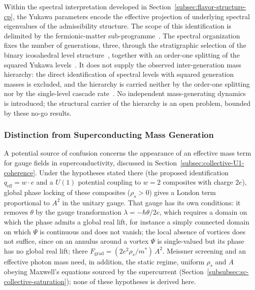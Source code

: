     Within the spectral interpretation developed in
    Section~\ref{subsec:flavor-structure-cp},
    the Yukawa parameters encode the effective projection of underlying
    spectral eigenvalues of the admissibility structure.
    The scope of this identification is delimited by the fermionic-matter
    sub-programme~\cite{Beau2026fmnote}.
    The spectral organization fixes the number of generations, three, through the
    stratigraphic selection of the binary icosahedral level structure~\cite{Beau2026a4},
    together with an order-one splitting of the squared Yukawa levels~\cite{Beau2026pyo}.
    It does not supply the observed inter-generation mass hierarchy:
    the direct identification of spectral levels with squared generation masses is
    excluded, and the hierarchy is carried neither by the order-one splitting nor by
    the single-level cascade rate~\cite{Beau2026pyo,Beau2026a5}.
    No independent mass-generating dynamics is introduced;
    the structural carrier of the hierarchy is an open problem, bounded by these
    no-go results.

  \subsubsection*{Distinction from Superconducting Mass Generation}

    A potential source of confusion concerns the appearance of an
    effective mass term for gauge fields in superconductivity,
    discussed in Section~\ref{subsec:collective-U1-coherence}.
    Under the hypotheses stated there (the proposed identification
    $q_{\mathrm{eff}} = w \cdot e$ and a $U(1)$ potential coupling to $w=2$
    composites with charge $2e$), global phase locking of these composites
    ($\rho_s > 0$) gives a London term proportional to $A^2$ in the unitary gauge.
    That gauge has its own conditions: it removes $\theta$ by the gauge
    transformation $\lambda = -\hbar\theta/2e$, which requires a domain on which the
    phase admits a global real lift, for instance a simply connected domain on which
    $\Psi$ is continuous and does not vanish; the local absence of vortices does not
    suffice, since on an annulus around a vortex $\Psi$ is single-valued but its phase
    has no global real lift; there
    $F_{\text{grad}} = (2e^2\rho_s/m^*)\,A^2$.
    Meissner screening and an effective photon mass need, in addition, the static
    regime, uniform $\rho_s$ and $A$ obeying Maxwell's equations sourced by the
    supercurrent (Section~\ref{subsubsec:sc-collective-saturation}); none of these
    hypotheses is derived here.

